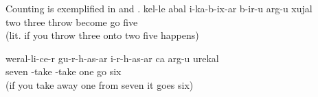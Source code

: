 Counting is exemplified in  and .
%
\ea\label{ex:twoplusthreeequalsfive}
\gll	k{\ej}{\lab}el-le	{\eppl}a{\pha}bal	{\paaf}i-ka-b-ix-ar	b-ir{\uvfr}{\lab}-u	arg-u	xujal\\
	two three	throw	become go five\\
\glt	{} (lit. if you throw three onto two five happens)

\ex\label{ex:sevenminusoneequalssix}
\gll	weral-li-c{\lmk}e-r	gu-r-h-as{\lmk}-ar	{\paaf}i-r-h-as{\lmk}-ar	ca	arg-u	urek{\lmk}al\\
	seven	-take	-take	one	go	six\\
\glt	{} (if you take away one from seven it goes six)
\z

